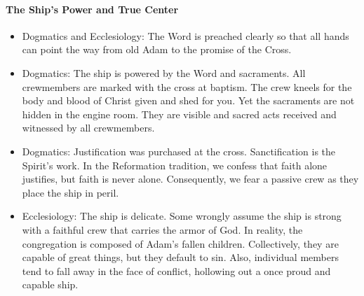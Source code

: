 \paragraph{The Ship’s Power and True Center}
\begin{itemize}

\item Dogmatics and Ecclesiology: The Word is preached clearly so that all hands can point the way from old Adam to the promise of the Cross.

\item Dogmatics: The ship is powered by the Word and sacraments. All crewmembers are marked with the cross at baptism. The crew kneels for the body and blood of Christ given and shed for you. Yet the sacraments are not hidden in the engine room. They are visible and sacred acts received and witnessed by all crewmembers.

\item Dogmatics: Justification was purchased at the cross. Sanctification is the Spirit's work. In the Reformation tradition, we confess that faith alone justifies, but faith is never alone. Consequently, we fear a passive crew as they place the ship in peril.

\item Ecclesiology: The ship is delicate. Some wrongly assume the ship is strong with a faithful crew that carries the armor of God. In reality, the congregation is composed of Adam's fallen children. Collectively, they are capable of great things, but they default to sin. Also, individual members tend to fall away in the face of conflict, hollowing out a once proud and capable ship.
\end{itemize}



